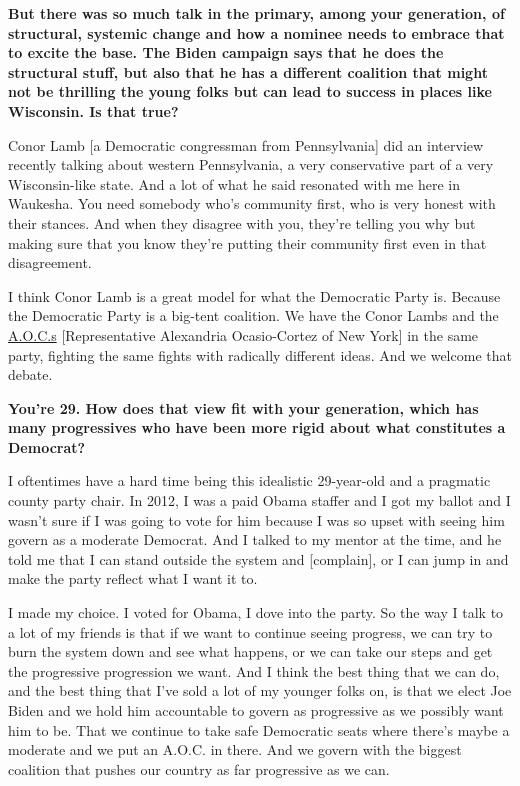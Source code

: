 \textbf{But there was so much talk in the primary, among your
generation, of structural, systemic change and how a nominee needs to
embrace that to excite the base. The Biden campaign says that he does
the structural stuff, but also that he has a different coalition that
might not be thrilling the young folks but can lead to success in places
like Wisconsin. Is that true?}

Conor Lamb {[}a Democratic congressman from Pennsylvania{]} did an
interview recently talking about western Pennsylvania, a very
conservative part of a very Wisconsin-like state. And a lot of what he
said resonated with me here in Waukesha. You need somebody who's
community first, who is very honest with their stances. And when they
disagree with you, they're telling you why but making sure that you know
they're putting their community first even in that disagreement.

I think Conor Lamb is a great model for what the Democratic Party is.
Because the Democratic Party is a big-tent coalition. We have the Conor
Lambs and the
\href{https://www.nytimes.com/2020/06/23/us/politics/aoc-facebook-ads.html}{A.O.C.s}
{[}Representative Alexandria Ocasio-Cortez of New York{]} in the same
party, fighting the same fights with radically different ideas. And we
welcome that debate.

\textbf{You're 29. How does that view fit with your generation, which
has many progressives who have been more rigid about what constitutes a
Democrat?}

I oftentimes have a hard time being this idealistic 29-year-old and a
pragmatic county party chair. In 2012, I was a paid Obama staffer and I
got my ballot and I wasn't sure if I was going to vote for him because I
was so upset with seeing him govern as a moderate Democrat. And I talked
to my mentor at the time, and he told me that I can stand outside the
system and {[}complain{]}, or I can jump in and make the party reflect
what I want it to.

I made my choice. I voted for Obama, I dove into the party. So the way I
talk to a lot of my friends is that if we want to continue seeing
progress, we can try to burn the system down and see what happens, or we
can take our steps and get the progressive progression we want. And I
think the best thing that we can do, and the best thing that I've sold a
lot of my younger folks on, is that we elect Joe Biden and we hold him
accountable to govern as progressive as we possibly want him to be. That
we continue to take safe Democratic seats where there's maybe a moderate
and we put an A.O.C. in there. And we govern with the biggest coalition
that pushes our country as far progressive as we can.

